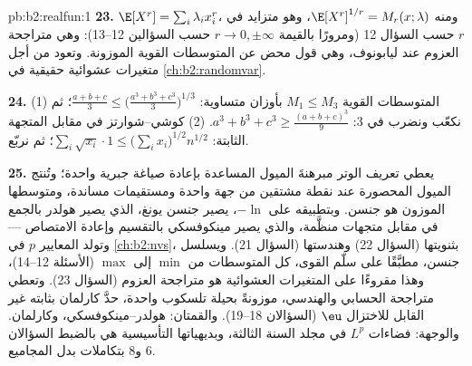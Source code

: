 \begin{solution}{pb:b2:realfun:1}
\textbf{23.} $\E[X^r] = \sum_i\lambda_ix_i^r$، ومنه
$\E[X^r]^{1/r} = M_r(x; \lambda)$، وهو متزايد في $r$ حسب
السؤال 12 (ومرورًا بالقيمة $r \to 0, \pm\infty$ حسب السؤالين
12--13): وهي متراجحة العزوم عند ليابونوف، وهي قول محض عن
المتوسطات القوية الموزونة. وتعود من أجل متغيرات عشوائية حقيقية
في \cref{ch:b2:randomvar}.

\textbf{24.} (1) المتوسطات القوية $M_1 \leq M_3$ بأوزان متساوية:
$\frac{a+b+c}3 \leq \bigl(\frac{a^3+b^3+c^3}3\bigr)^{1/3}$؛
ثم نكعّب ونضرب في $3$: $a^3 + b^3 + c^3 \geq
\frac{(a+b+c)^3}9$. (2) كوشي--شوارتز في مقابل المتجهة
الثابتة: $\sum_i\sqrt{x_i}\cdot1 \leq
\bigl(\sum_ix_i\bigr)^{1/2}n^{1/2}$؛ ثم نربّع.

\textbf{25.} يعطي تعريف الوتر مبرهنةَ الميول المساعدة بإعادة
صياغة جبرية واحدة؛ وتُنتج الميول المحصورة عند نقطة
مشتقين من جهة واحدة ومستقيمات مساندة، ومتوسطها الموزون
هو جنسن. وبتطبيقه على $-\ln$، يصير جنسن يونغ، الذي
يصير هولدر بالجمع في مقابل متجهات منظَّمة، والذي يصير مينكوفسكي بالتقسيم
وإعادة الامتصاص --- وتولد المعايير $p$ في
\cref{ch:b2:nvs}، بثنويتها (السؤال 22)
وهندستها (السؤال 21). ويسلسل جنسن، مطبَّقًا على
سلّم القوى، كل المتوسطات من $\min$ إلى $\max$
(الأسئلة 12--14)، وهذا مقروءًا على المتغيرات العشوائية هو
متراجحة العزوم (السؤال 23). وتعطي متراجحة الحسابي والهندسي، موزونةً بحيلة
تلسكوب واحدة، حدَّ كارلمان بثابته
غير القابل للاختزال $\eu$ (السؤالان 18--19). والقمتان:
هولدر--مينكوفسكي، وكارلمان. والوجهة: فضاءات $L^p$
في مجلد السنة الثالثة، وبديهياتها التأسيسية هي بالضبط
السؤالان 6 و8 بتكاملات بدل المجاميع.
\end{solution}
